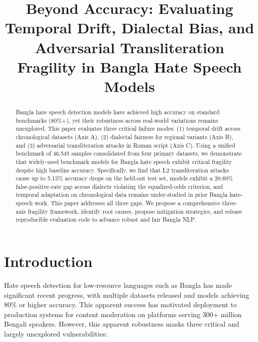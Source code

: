 \documentclass[conference]{IEEEtran}
\title{Beyond Accuracy: Evaluating Temporal Drift, Dialectal Bias, and Adversarial Transliteration Fragility in Bangla Hate Speech Models}
\author{\IEEEauthorblockN{Anonymous}
\IEEEauthorblockA{\textit{COMPAS 2026 -- Fairness, Accountability, and Transparency}}}
\begin{document}
\maketitle

\begin{abstract}

Bangla hate speech detection models have achieved high accuracy on standard benchmarks (80\%+), yet their robustness across real-world variations remains unexplored. This paper evaluates three critical failure modes: (1) temporal drift across chronological datasets (Axis A), (2) dialectal fairness for regional variants (Axis B), and (3) adversarial transliteration attacks in Roman script (Axis C). Using a unified benchmark of 46,545 samples consolidated from four primary datasets, we demonstrate that widely-used benchmark models for Bangla hate speech exhibit critical fragility despite high baseline accuracy. Specifically, we find that L2 transliteration attacks cause up to 5.13\% accuracy drops on the held-out test set, models exhibit a 20.89\% false-positive-rate gap across dialects violating the equalized-odds criterion, and temporal adaptation on chronological data remains under-studied in prior Bangla hate-speech work. This paper addresses all three gaps. We propose a comprehensive three-axis fragility framework, identify root causes, propose mitigation strategies, and release reproducible evaluation code to advance robust and fair Bangla NLP.

\end{abstract}

\section{Introduction}

Hate speech detection for low-resource languages such as Bangla has made significant recent progress, with multiple datasets released and models achieving 80\% or higher accuracy. This apparent success has motivated deployment to production systems for content moderation on platforms serving 300+ million Bengali speakers. However, this apparent robustness masks three critical and largely unexplored vulnerabilities:
\end{document}
